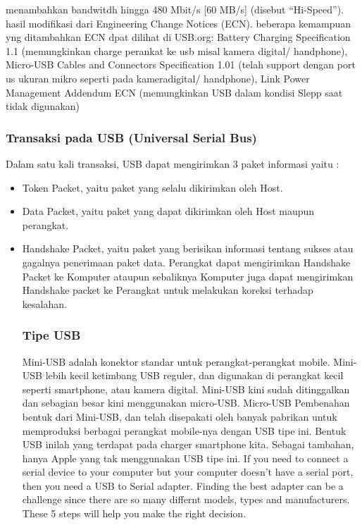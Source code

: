menambahkan bandwitdh hingga 480 Mbit/s [60 MB/s] (disebut “Hi-Speed”). hasil modifikasi dari Engineering Change Notices (ECN). beberapa kemampuan yng ditambahkan ECN dpat dilihat di USB.org: Battery Charging Specification 1.1 (memungkinkan charge perankat ke usb misal kamera digital/ handphone), Micro-USB Cables and Connectors Specification 1.01 (telah support dengan port us ukuran mikro seperti pada kameradigital/ handphone), Link Power Management Addendum ECN (memungkinkan USB dalam kondisi Slepp saat tidak digunakan)

\subsubsection{Transaksi pada USB (Universal Serial Bus)}
Dalam satu kali transaksi, USB dapat mengirimkan 3 paket informasi yaitu :
\begin{itemize}
\item Token Packet, yaitu paket yang selalu dikirimkan oleh Host.
\item Data Packet, yaitu paket yang dapat dikirimkan oleh Host maupun perangkat.
\item Handshake Packet, yaitu paket yang berisikan informasi tentang sukses atau gagalnya penerimaan paket data. Perangkat dapat mengirimkan Handshake Packet ke Komputer ataupun sebaliknya Komputer juga dapat mengirimkan Handshake packet ke Perangkat untuk melakukan koreksi terhadap kesalahan.

\subsubsection{Tipe USB}
Mini-USB adalah konektor standar untuk perangkat-perangkat mobile. Mini-USB lebih kecil ketimbang USB reguler, dan digunakan di perangkat kecil seperti smartphone, atau kamera digital. Mini-USB kini sudah ditinggalkan dan sebagian besar kini menggunakan micro-USB.
Micro-USB
Pembenahan bentuk dari Mini-USB, dan telah disepakati oleh banyak pabrikan untuk memproduksi berbagai perangkat mobile-nya dengan USB tipe ini. Bentuk USB inilah yang terdapat pada charger smartphone kita. Sebagai tambahan, hanya Apple yang tak menggunakan USB tipe ini.
If you need to connect a serial device to your computer but your computer doesn't have a serial port, then you need a USB to Serial adapter. Finding the best adapter can be a challenge since there are so many differnt models, types and manufacturers. These 5 steps will help you make the right decision. 


\end{itemize}
